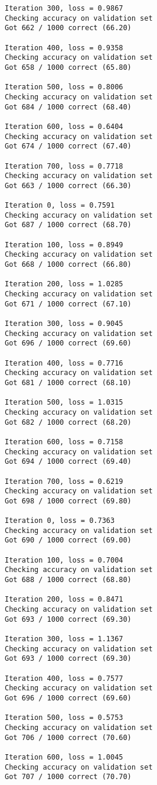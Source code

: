 \documentclass[11pt]{article}
\begin{document}
\begin{Verbatim}[commandchars=\\\{\}]
Iteration 300, loss = 0.9867
Checking accuracy on validation set
Got 662 / 1000 correct (66.20)

Iteration 400, loss = 0.9358
Checking accuracy on validation set
Got 658 / 1000 correct (65.80)

Iteration 500, loss = 0.8006
Checking accuracy on validation set
Got 684 / 1000 correct (68.40)

Iteration 600, loss = 0.6404
Checking accuracy on validation set
Got 674 / 1000 correct (67.40)

Iteration 700, loss = 0.7718
Checking accuracy on validation set
Got 663 / 1000 correct (66.30)

Iteration 0, loss = 0.7591
Checking accuracy on validation set
Got 687 / 1000 correct (68.70)

Iteration 100, loss = 0.8949
Checking accuracy on validation set
Got 668 / 1000 correct (66.80)

Iteration 200, loss = 1.0285
Checking accuracy on validation set
Got 671 / 1000 correct (67.10)

Iteration 300, loss = 0.9045
Checking accuracy on validation set
Got 696 / 1000 correct (69.60)

Iteration 400, loss = 0.7716
Checking accuracy on validation set
Got 681 / 1000 correct (68.10)

Iteration 500, loss = 1.0315
Checking accuracy on validation set
Got 682 / 1000 correct (68.20)

Iteration 600, loss = 0.7158
Checking accuracy on validation set
Got 694 / 1000 correct (69.40)

Iteration 700, loss = 0.6219
Checking accuracy on validation set
Got 698 / 1000 correct (69.80)

Iteration 0, loss = 0.7363
Checking accuracy on validation set
Got 690 / 1000 correct (69.00)

Iteration 100, loss = 0.7004
Checking accuracy on validation set
Got 688 / 1000 correct (68.80)

Iteration 200, loss = 0.8471
Checking accuracy on validation set
Got 693 / 1000 correct (69.30)

Iteration 300, loss = 1.1367
Checking accuracy on validation set
Got 693 / 1000 correct (69.30)

Iteration 400, loss = 0.7577
Checking accuracy on validation set
Got 696 / 1000 correct (69.60)

Iteration 500, loss = 0.5753
Checking accuracy on validation set
Got 706 / 1000 correct (70.60)

Iteration 600, loss = 1.0045
Checking accuracy on validation set
Got 707 / 1000 correct (70.70)


\end{Verbatim}
\end{document}
